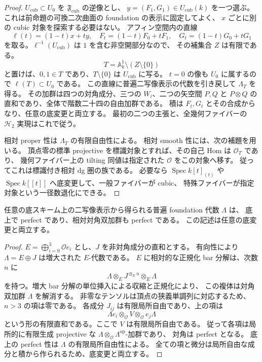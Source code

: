 \begin{proof}
$U_{\mathrm{cub}}\subset U_0$ を $\mathfrak F_{\mathrm{cub}}$ の逆像とし、
$y=(F_1,G_1)\in U_{\mathrm{cub}}(k)$ を一つ選ぶ。
これは前命題の可換二次曲面の foundation の表示に固定してよく、
$x$ ごとに別の cubic 対象を探索する必要はない。
アフィン空間内の直線
\[
 \ell(t)=(1-t)x+ty,
 \quad
 F_t=(1-t)F_0+tF_1,
 \quad
 G_t=(1-t)G_0+tG_1
\]
を取る。$\ell^{-1}(U_{\mathrm{cub}})$ は $1$ を含む非空開部分なので、
その補集合 $Z$ は有限である。
\[
 T=\mathbb A^1_k\setminus(Z\setminus\{0\})
\]
と置けば、$0,1\in T$ であり、$T\setminus\{0\}$ は $U_{\mathrm{cub}}$ に写る。
$t=0$ の像も $U_0$ に属するので $\ell(T)\subset U_0$ である。
この直線に普遍二写像表示の代数を引き戻して $\Lambda_T$ を得る。
その加群は四つの対角成分、三つの $W_i$、二つの矢空間 $P,Q$ と
$P\otimes Q$ の直和であり、全体で階数二十四の自由加群である。
積は $F_t,G_t$ とその合成からなり、任意の底変更と両立する。
最初の二つの主張と、全幾何ファイバーの $\mathcal H_2$ 実現はこれで従う。

相対 proper 性は $\Lambda_T$ の有限自由性による。
相対 smooth 性には、次の補題を用いる。
頂点零の標準 projective を標識対象とすれば、その自己 Hom は $\mathcal O_T$ であり、
幾何ファイバー上の tilting 同値は指定された $\mathcal O$ をこの対象へ移す。
従ってこれは標識付き相対 dg 圏の族である。
必要なら $\operatorname{Spec}k[t]_{(t)}$ や
$\operatorname{Spec}k[[t]]$ へ底変更して、一般ファイバーが cubic、
特殊ファイバーが指定対象という一径数退化にできる。
\end{proof}

\begin{lemma}
\label{lem:foundation-relative-smooth-proper}
任意の底スキーム上の二写像表示から得られる普遍 foundation 代数 $\Lambda$ は、
底上で perfect であり、相対対角双加群も perfect である。
この記述は任意の底変更と両立する。
\end{lemma}
\begin{proof}
$E=\bigoplus_{i=0}^3\mathcal O e_i$ とし、$J$ を非対角成分の直和とする。
有向性により $\Lambda=E\oplus J$ は増大された $E$-代数である。
$E$ に相対的な正規化 bar 分解は、次数 $n$ に
\[
 \Lambda\otimes_E J^{\otimes_E n}\otimes_E\Lambda
\]
を持つ。増大 bar 分解の単位挿入による収縮と正規化により、
この複体は対角双加群 $\Lambda$ を解消する。
非零なテンソルは頂点の狭義単調列に対応するため、$n>3$ の項は零である。
各成分 $J_{ij}$ は有限局所自由であり、上の項は
\[
 \Lambda e_i\otimes_{\mathcal O} V\otimes_{\mathcal O}e_j\Lambda
\]
という形の有限直和である。ここで $V$ は有限局所自由である。
従って各項は局所的に有限生成 projective な
$\Lambda\otimes_{\mathcal O}\Lambda^{\mathrm{op}}$-加群であり、
対角は perfect となる。
底上の perfect 性は $\Lambda$ の有限局所自由性による。
全ての項と微分は局所自由な成分と積から作られるため、底変更と両立する。
\end{proof}

